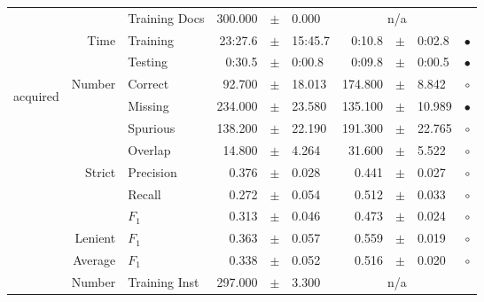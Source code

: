 \begin{longtable}{|r|r|l||rcl|rcl|c|}
\cline{3-10} &                             &   Training Docs &     300.000 &  $\pm$  &       0.000 &    \multicolumn{3}{c|}{n/a}         &  \\
\cline{2-10} & \multirow{2}{*}{      Time} &        Training &     23:27.6 &  $\pm$  &     15:45.7 &      0:10.8 &  $\pm$  &      0:02.8 & $\bullet$ \\
\cline{3-10} &                             &         Testing &      0:30.5 &  $\pm$  &      0:00.8 &      0:09.8 &  $\pm$  &      0:00.5 & $\bullet$ \\
\hline
\hline
\multirow{11}{*}{\begin{sideways}acquired\end{sideways} }
             & \multirow{4}{*}{    Number} &         Correct &      92.700 &  $\pm$  &      18.013 &     174.800 &  $\pm$  &       8.842 & $\circ$ \\
\cline{3-10} &                             &         Missing &     234.000 &  $\pm$  &      23.580 &     135.100 &  $\pm$  &      10.989 & $\bullet$ \\
\cline{3-10} &                             &        Spurious &     138.200 &  $\pm$  &      22.190 &     191.300 &  $\pm$  &      22.765 & $\circ$ \\
\cline{3-10} &                             &         Overlap &      14.800 &  $\pm$  &       4.264 &      31.600 &  $\pm$  &       5.522 & $\circ$ \\
\cline{2-10} & \multirow{3}{*}{    Strict} &       Precision &       0.376 &  $\pm$  &       0.028 &       0.441 &  $\pm$  &       0.027 & $\circ$ \\
\cline{3-10} &                             &          Recall &       0.272 &  $\pm$  &       0.054 &       0.512 &  $\pm$  &       0.033 & $\circ$ \\
\cline{3-10} &                             &           $F_1$ &       0.313 &  $\pm$  &       0.046 &       0.473 &  $\pm$  &       0.024 & $\circ$ \\
\cline{2-10} &                     Lenient &           $F_1$ &       0.363 &  $\pm$  &       0.057 &       0.559 &  $\pm$  &       0.019 & $\circ$ \\
\cline{2-10} &                     Average &           $F_1$ &       0.338 &  $\pm$  &       0.052 &       0.516 &  $\pm$  &       0.020 & $\circ$ \\
\cline{2-10} & \multirow{2}{*}{    Number} &   Training Inst &     297.000 &  $\pm$  &       3.300 &    \multicolumn{3}{c|}{n/a}         &  \\

\end{longtable}
